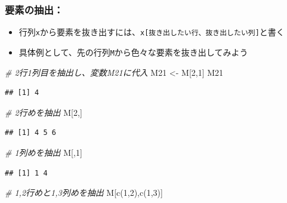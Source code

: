 \documentclass[
]{book}
\newenvironment{Shaded}{\begin{snugshade}}{\end{snugshade}}
\newcommand{\CommentTok}[1]{\textcolor[rgb]{0.56,0.35,0.01}{\textit{#1}}}
\newcommand{\DecValTok}[1]{\textcolor[rgb]{0.00,0.00,0.81}{#1}}
\newcommand{\FunctionTok}[1]{\textcolor[rgb]{0.00,0.00,0.00}{#1}}
\newcommand{\NormalTok}[1]{#1}
\newcommand{\OtherTok}[1]{\textcolor[rgb]{0.56,0.35,0.01}{#1}}
\providecommand{\tightlist}{%
  \setlength{\itemsep}{0pt}\setlength{\parskip}{0pt}}
\begin{document}
\hypertarget{ux8981ux7d20ux306eux62bdux51fa-1}{%
\subsubsection*{要素の抽出：}\label{ux8981ux7d20ux306eux62bdux51fa-1}}

\begin{itemize}
\tightlist
\item
  行列\texttt{x}から要素を抜き出すには、\texttt{x{[}抜き出したい行、抜き出したい列{]}}と書く
\item
  具体例として、先の行列\texttt{M}から色々な要素を抜き出してみよう
\end{itemize}

\begin{Shaded}
\begin{Highlighting}[]
\CommentTok{\# 2行1列目を抽出し、変数M21に代入}
\NormalTok{M21 }\OtherTok{\textless{}{-}}\NormalTok{ M[}\DecValTok{2}\NormalTok{,}\DecValTok{1}\NormalTok{]}
\NormalTok{M21}
\end{Highlighting}
\end{Shaded}

\begin{verbatim}
## [1] 4
\end{verbatim}

\begin{Shaded}
\begin{Highlighting}[]
\CommentTok{\# 2行めを抽出}
\NormalTok{M[}\DecValTok{2}\NormalTok{,]}
\end{Highlighting}
\end{Shaded}

\begin{verbatim}
## [1] 4 5 6
\end{verbatim}

\begin{Shaded}
\begin{Highlighting}[]
\CommentTok{\# 1列めを抽出}
\NormalTok{M[,}\DecValTok{1}\NormalTok{]}
\end{Highlighting}
\end{Shaded}

\begin{verbatim}
## [1] 1 4
\end{verbatim}

\begin{Shaded}
\begin{Highlighting}[]
\CommentTok{\# 1,2行めと1,3列めを抽出}
\NormalTok{M[}\FunctionTok{c}\NormalTok{(}\DecValTok{1}\NormalTok{,}\DecValTok{2}\NormalTok{),}\FunctionTok{c}\NormalTok{(}\DecValTok{1}\NormalTok{,}\DecValTok{3}\NormalTok{)]}
\end{Highlighting}
\end{Shaded}
\end{document}
